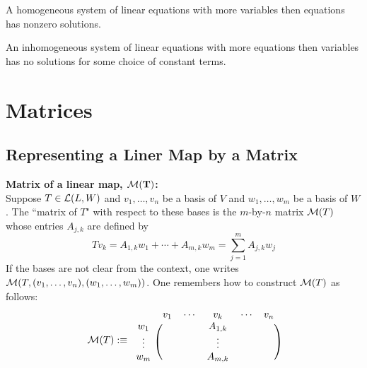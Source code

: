 \setcounter{thm}{25}
\begin{thm}
    A homogeneous system of linear equations with more variables then equations has nonzero solutions.
\end{thm}

\setcounter{thm}{27}
\begin{thm}
	An inhomogeneous system of linear equations with more equations then variables has no solutions for some choice of constant terms.
\end{thm}

\pagebreak

\section{Matrices}
\subsection{Representing a Liner Map by a Matrix}

\setcounter{thm}{30}
\begin{mydef}
    \label{matrix-of-linear-map}
    \textbf{Matrix of a linear map, $\mathbf{\mathcal{M}(T)}$:} \\
    Suppose $T \in \mathcal{L} (L,W)$ and $v_1, \dots, v_n$ be a basis of $V$ and $w_1, \dots, w_m$ be a basis of $W$. The ``matrix of $T$" with respect to these bases is the $m$-by-$n$ matrix $\mathcal{M}(T)$ whose entries $A_{j,k}$ are defined by
    \begin{equation}
        T v_k = A_{1,k} w_1 + \cdots + A_{m,k} w_m = \sum_{j=1}^{m} A_{j,k} w_j
    \end{equation}
    If the bases are not clear from the context, one writes $\mathcal{M}(T, (v_1, \dots, v_n),(w_1, \dots, w_m))$. One remembers how to construct $\mathcal{M}(T)$ as follows:
    \begin{equation}
        \mathcal{M} (T) :\equiv
        \begin{blockarray}{cccc}
            & v_1 \quad \cdots & v_k & \cdots \quad v_n \\
            \begin{block}{c(ccc)}
                w_1    & & A_{1,k} & \\
                \vdots & & \vdots & \\
                w_m    & & A_{m,k} & \\
            \end{block}
        \end{blockarray}
    \end{equation}
\end{mydef}

